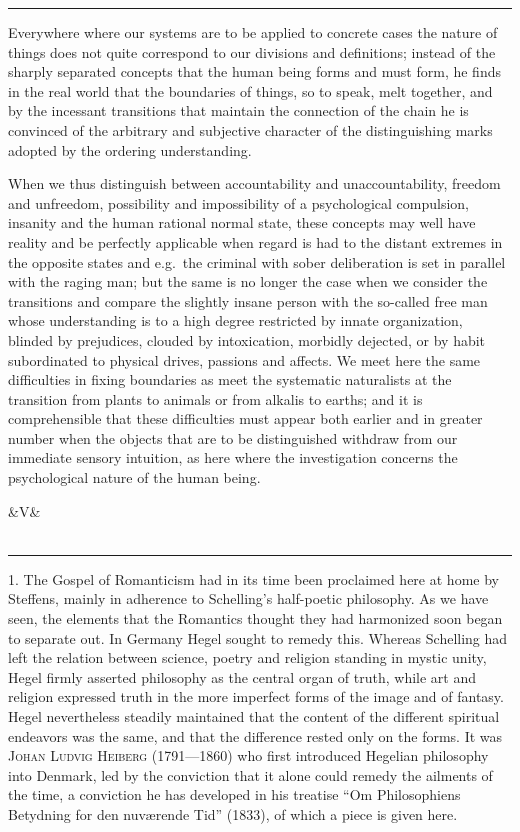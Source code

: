 \documentclass[12pt,a4paper,openany]{book}
\newcommand{\opage}[1]{\marginnote{\footnotesize\textit{[#1]}}}
\newcommand{\anthsection}[2]{\clearpage\begin{center}\ifx&#1&\else{\large #1}\\[0.6em]\fi{\Large #2}\\[0.5em]\rule{3em}{0.4pt}\end{center}\medskip}
\newenvironment{intro}{\par}{\par}
\newcommand{\sectionrule}{\par\begin{center}\rule{4em}{0.4pt}\end{center}}
\begin{document}
\sectionrule

Everywhere where our systems are to be applied to concrete cases the nature of things
does not quite correspond to our divisions and definitions; instead of the sharply
separated concepts that the human being forms and must form, he finds in the real
world that the boundaries of things, so to speak, melt together, and by the
incessant transitions that maintain the connection of the chain he is convinced of
the arbitrary and subjective character of the distinguishing marks adopted by the
ordering understanding.

When we thus distinguish between accountability and unaccountability, freedom and
unfreedom, possibility and impossibility of a psychological compulsion, insanity and
the human rational normal state, these concepts may well have reality and be
perfectly applicable when regard is had to the distant extremes in the opposite
states and e.g.\ the criminal with sober deliberation is set in parallel with the
raging man; but the same is no longer the case when we consider the transitions and
compare the slightly insane person with the so-called free man whose understanding
is to a high degree restricted by innate organization, blinded by prejudices,
clouded by intoxication, morbidly dejected, or by habit subordinated to physical
drives, passions and affects. We meet here the same difficulties in fixing boundaries
as meet the systematic naturalists at the transition from plants to animals or from
alkalis to earths; and it is comprehensible that these difficulties must appear both
earlier and in greater number when the objects that are to be distinguished withdraw
from our immediate sensory intuition, as here where the investigation concerns the
psychological nature of the human being.

\setcounter{footnote}{0}%
\anthsection{V} {HEIBERG AND POUL MØLLER}\opage{146}

\begin{intro}

1. The Gospel of Romanticism had in its time been proclaimed here at home by
Steffens, mainly in adherence to Schelling's half-poetic philosophy. As we have seen,
the elements that the Romantics thought they had harmonized soon began to separate
out. In Germany Hegel sought to remedy this. Whereas Schelling had left the relation
between science, poetry and religion standing in mystic unity, Hegel firmly asserted
philosophy as the central organ of truth, while art and religion expressed truth in
the more imperfect forms of the image and of fantasy. Hegel nevertheless steadily
maintained that the content of the different spiritual endeavors was the same, and
that the difference rested only on the forms. It was \textsc{Johan Ludvig Heiberg}
(1791---1860) who first introduced Hegelian philosophy into Denmark, led by the
conviction that it alone could remedy the ailments of the time, a conviction he has
developed in his treatise ``Om Philosophiens Betydning for den nuværende Tid''
(1833), of which a piece is given here.
\end{intro}
\end{document}
